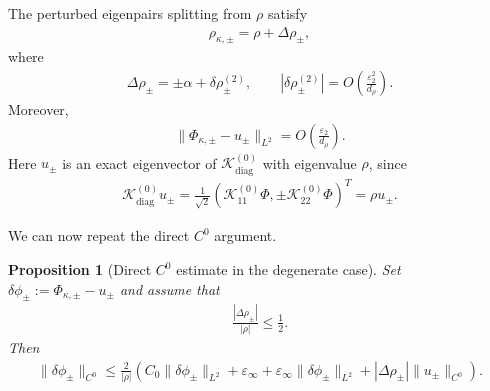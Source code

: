 \documentclass[10pt]{article}
\numberwithin{equation}{section}
\newtheorem{proposition}[theorem]{Proposition}
\begin{document}
The perturbed eigenpairs splitting from $\rho$ satisfy
\begin{align*}
    \rho_{\kappa,\pm}
    =
    \rho+\Delta\rho_\pm,
\end{align*}
where
\begin{align*}
    \Delta\rho_\pm
    =
    \pm\alpha+\delta\rho_\pm^{(2)},
    \qquad
    |\delta\rho_\pm^{(2)}|
    =
    O\left(
        \frac{\varepsilon_2^2}{d_\rho}
    \right).
\end{align*}
Moreover,
\begin{align*}
    \|\Phi_{\kappa,\pm}-u_\pm\|_{L^2}
    =
    O\left(
        \frac{\varepsilon_2}{d_\rho}
    \right).
\end{align*}
Here $u_\pm$ is an exact eigenvector of $\mathcal{K}_{\mathrm{diag}}^{(0)}$ with eigenvalue $\rho$, since
\begin{align*}
    \mathcal{K}_{\mathrm{diag}}^{(0)}u_\pm
    =
    \frac{1}{\sqrt2}
    \left(
    \mathcal{K}_{11}^{(0)}\Phi,
    \pm \mathcal{K}_{22}^{(0)}\Phi
    \right)^T
    =
    \rho u_\pm.
\end{align*}

We can now repeat the direct $C^0$ argument.

\begin{proposition}[Direct $C^0$ estimate in the degenerate case]
\label{prop:directC0_deg}
Set $\delta\phi_\pm := \Phi_{\kappa,\pm}-u_\pm$ and assume that
\begin{align*}
    \frac{|\Delta\rho_\pm|}{|\rho|}
    \leq
    \frac12.
\end{align*}
Then
\begin{align*}
    \|\delta\phi_\pm\|_{C^0}
    \leq
    \frac{2}{|\rho|}
    \left(
    C_0\|\delta\phi_\pm\|_{L^2}
    +
    \varepsilon_\infty
    +
    \varepsilon_\infty\|\delta\phi_\pm\|_{L^2}
    +
    |\Delta\rho_\pm|\|u_\pm\|_{C^0}
    \right).
\end{align*}
\end{proposition}
\end{document}
